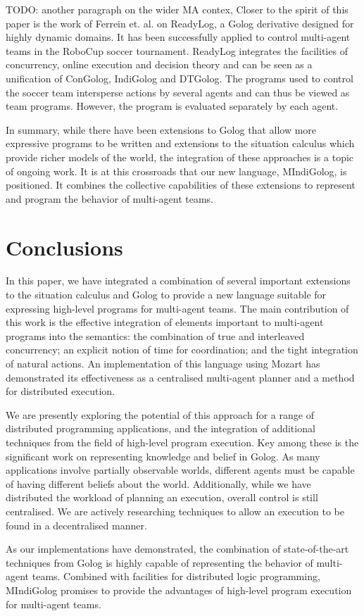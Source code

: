 \documentclass[letterpaper]{article}
\begin{document}
TODO: another paragraph on the wider MA contex,
Closer to the spirit of this paper is the work of Ferrein et. al.
\cite{Ferrein2005readylog} on ReadyLog, a Golog derivative designed
for highly dynamic domains. It has been successfully applied to control
multi-agent teams in the RoboCup soccer tournament. ReadyLog integrates
the facilities of concurrency, online execution and decision theory
and can be seen as a unification of ConGolog, IndiGolog and DTGolog.
The programs used to control the soccer team intersperse actions by
several agents and can thus be viewed as team programs. However, the
program is evaluated separately by each agent.

In summary, while there have been extensions to Golog that allow more
expressive programs to be written and extensions to the situation
calculus which provide richer models of the world, the integration
of these approaches is a topic of ongoing work. It is at this crossroads
that our new language, MIndiGolog, is positioned. It combines the
collective capabilities of these extensions to represent and program
the behavior of multi-agent teams.


\section{Conclusions}

\label{sec:Conclusions-and-Future}

In this paper, we have integrated a combination of several important
extensions to the situation calculus and Golog to provide a new language
suitable for expressing high-level programs for multi-agent teams.
The main contribution of this work is the effective integration of
elements important to multi-agent programs into the semantics: the
combination of true and interleaved concurrency; an explicit notion
of time for coordination; and the tight integration of natural actions.
An implementation of this language using Mozart has demonstrated its
effectiveness as a centralised multi-agent planner and a method for
distributed execution. 

We are presently exploring the potential of this approach for a range
of distributed programming applications, and the integration of additional
techniques from the field of high-level program execution. Key among
these is the significant work on representing knowledge and belief
in Golog. As many applications involve partially observable worlds,
different agents must be capable of having different beliefs about
the world. Additionally, while we have distributed the workload of
planning an execution, overall control is still centralised. We are
actively researching techniques to allow an execution to be found
in a decentralised manner.

As our implementations have demonstrated, the combination of state-of-the-art
techniques from Golog is highly capable of representing the behavior
of multi-agent teams. Combined with facilities for distributed logic
programming, MIndiGolog promises to provide the advantages of high-level
program execution for multi-agent teams.



\end{document}
